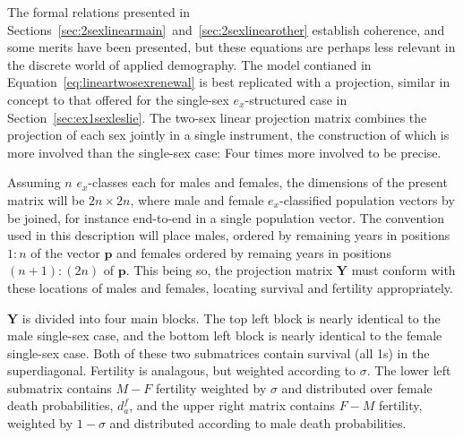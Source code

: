 
The formal relations presented in
Sections~\ref{sec:2sexlinearmain}~and~\ref{sec:2sexlinearother} establish
coherence, and some merits have been presented, but these equations are perhaps
less relevant in the discrete world of applied demography. The model contianed
in Equation~\ref{eq:lineartwosexrenewal} is best replicated with a projection,
similar in concept to that offered for the single-sex $e_x$-structured case in
Section~\ref{sec:ex1sexleslie}. The two-sex linear projection matrix combines
the projection of each sex jointly in a single instrument, the construction of 
which is more involved than the single-sex case: Four times more involved to be precise. 

Assuming $n$ $e_x$-classes each for males and females, the dimensions of the
present matrix will be $2n \times 2n$, where male and female
$e_x$-classified population vectors by be joined, for instance end-to-end in a
single population vector. The convention used in this description will place
males, ordered by remaining years in positions $1:n$ of the vector $\textbf{p}$
and females ordered by remaing years in positions $(n+1):(2n)$ of $\textbf{p}$.
This being so, the projection matrix $\textbf{Y}$ must conform with these
locations of males and females, locating survival and fertility appropriately.

$\textbf{Y}$ is divided into four main blocks. The top left block is
nearly identical to the male single-sex case, and the bottom left block is
nearly identical to the female single-sex case. Both of these two submatrices
contain survival (all 1s) in the superdiagonal. Fertility is analagous, but
weighted according to $\sigma$. The lower left submatrix contains $M-F$
fertility weighted by $\sigma$ and distributed over female death probabilities,
$d_a^f$, and the upper right matrix contains $F-M$ fertility, weighted by
$1-\sigma$ and distributed according to male death probabilities.


